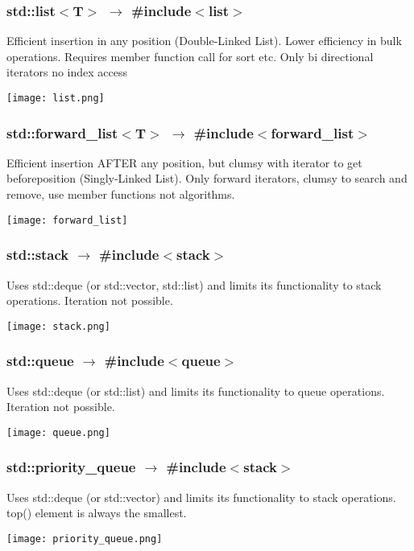 \subsubsection{std::list$<$T$>$ $\rightarrow$ \#include$<$list$>$}
Efficient insertion in any position (Double-Linked List). Lower efficiency in bulk operations. Requires member function call for sort etc. Only bi directional iterators no index access
\begin{center}
    \texttt{[image: list.png]}
\end{center}
\subsubsection{std::forward\_list$<$T$>$ $\rightarrow$ \#include$<$forward\_list$>$}
Efficient insertion AFTER any position, but clumsy with iterator to get \dq before\dq position (Singly-Linked List). Only forward iterators, clumsy to search and remove, use member functions not algorithms.
\begin{center}
    \texttt{[image: forward\_list]}
\end{center}
\subsubsection{std::stack $\rightarrow$ \#include$<$stack$>$}
Uses std::deque (or std::vector, std::list) and limits its functionality to stack operations. Iteration not possible.
\begin{center}
    \texttt{[image: stack.png]}
\end{center}
\subsubsection{std::queue $\rightarrow$ \#include$<$queue$>$}
Uses std::deque (or std::list) and limits its functionality to queue operations. Iteration not possible.
\begin{center}
    \texttt{[image: queue.png]}
\end{center}
\subsubsection{std::priority\_queue $\rightarrow$ \#include$<$stack$>$}
Uses std::deque (or std::vector) and limits its functionality to stack operations. top() element is always the smallest.
\begin{center}
    \texttt{[image: priority\_queue.png]}
\end{center}
